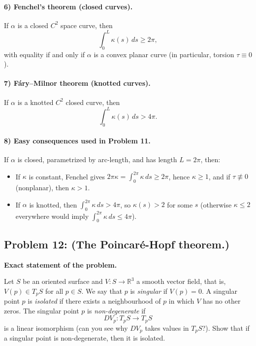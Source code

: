 \documentclass[12pt,a4paper]{article}
\theoremstyle{plain}
\theoremstyle{definition}      %
\begin{document}
	\paragraph{6) Fenchel's theorem (closed curves).}
	If $\alpha$ is a closed $C^2$ space curve, then
	\[
	\int_0^L \kappa(s)\,ds \ge 2\pi,
	\]
	with equality if and only if $\alpha$ is a convex planar curve (in particular, torsion $\tau\equiv 0$).
	
	\paragraph{7) F\'ary--Milnor theorem (knotted curves).}
	If $\alpha$ is a knotted $C^2$ closed curve, then
	\[
	\int_0^L \kappa(s)\,ds > 4\pi.
	\]
	
	\paragraph{8) Easy consequences used in Problem 11.}
	If $\alpha$ is closed, parametrized by arc-length, and has length $L=2\pi$, then:
	\begin{itemize}
		\item If $\kappa$ is constant, Fenchel gives $2\pi\kappa=\int_0^{2\pi}\kappa\,ds\ge 2\pi$, hence $\kappa\ge 1$,
		and if $\tau\not\equiv 0$ (nonplanar), then $\kappa>1$.
		\item If $\alpha$ is knotted, then $\int_0^{2\pi}\kappa\,ds>4\pi$, so $\kappa(s)>2$ for some $s$
		(otherwise $\kappa\le 2$ everywhere would imply $\int_0^{2\pi}\kappa\,ds\le 4\pi$).
	\end{itemize}
	
	\subsection*{Problem 12: (The Poincar\'e-Hopf theorem.)}
	
	\noindent\textbf{Exact statement of the problem.}
	
	Let $S$ be an oriented surface and $V : S \to \mathbb{R}^3$ a smooth vector field, that
	is, $V(p) \in T_pS$ for all $p \in S$. We say that $p$ is \emph{singular} if $V(p)=0$.
	A singular point $p$ is \emph{isolated} if there exists a neighbourhood of $p$ in
	which $V$ has no other zeros. The singular point $p$ is \emph{non-degenerate} if
	\[
	DV_p : T_pS \to T_pS
	\]
	is a linear isomorphism (can you see why $DV_p$ takes values in $T_pS$?).
	Show that if a singular point is non-degenerate, then it is isolated.
	
\end{document}
